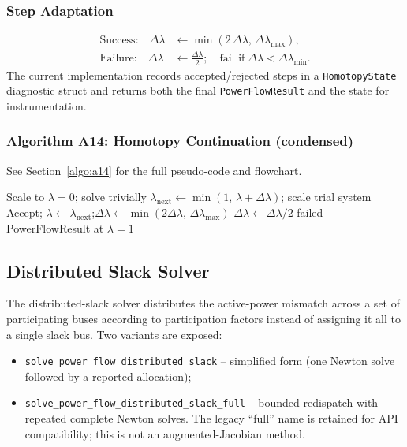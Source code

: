 \subsubsection{Step Adaptation}

\begin{align}
\text{Success:}\quad\Delta\lambda &\leftarrow \min(2\,\Delta\lambda,\,\Delta\lambda_{\max}), \\
\text{Failure:}\quad\Delta\lambda &\leftarrow \frac{\Delta\lambda}{2};\quad
\text{fail if}\;\Delta\lambda < \Delta\lambda_{\min}.
\end{align}
The current implementation records accepted/rejected steps in a
\texttt{HomotopyState} diagnostic struct and returns both the final
\texttt{PowerFlowResult} and the state for instrumentation.

\subsubsection{Algorithm A14: Homotopy Continuation (condensed)}
\label{algo:a14-inline}
See Section~\ref{algo:a14} for the full pseudo-code and flowchart.

\begin{algorithmic}[1]
  \State Scale to $\lambda{=}0$; solve trivially
    \State $\lambda_{\mathrm{next}} \gets \min(1,\,\lambda + \Delta\lambda)$;\quad
      scale trial system
      \State Accept; $\lambda \gets \lambda_{\mathrm{next}}$;\quad $\Delta\lambda \gets \min(2\Delta\lambda,\,\Delta\lambda_{\max})$
    \Else
      \State $\Delta\lambda \gets \Delta\lambda/2$
      \If{$\Delta\lambda < \Delta\lambda_{\min}$} \Return failed \EndIf
    \EndIf
  \EndWhile
  \State \Return PowerFlowResult at $\lambda{=}1$
\EndProcedure
\end{algorithmic}

\subsection{Distributed Slack Solver}
\label{sec:distributed-slack}

The distributed-slack solver distributes the active-power mismatch across a set
of participating buses according to participation factors instead of assigning
it all to a single slack bus.  Two variants are exposed:
\begin{itemize}
  \item \texttt{solve\_power\_flow\_distributed\_slack} -- simplified form
  (one Newton solve followed by a reported allocation);
  \item \texttt{solve\_power\_flow\_distributed\_slack\_full} -- bounded
  redispatch with repeated complete Newton solves.  The legacy ``full'' name is
  retained for API compatibility; this is not an augmented-Jacobian method.
\end{itemize}

